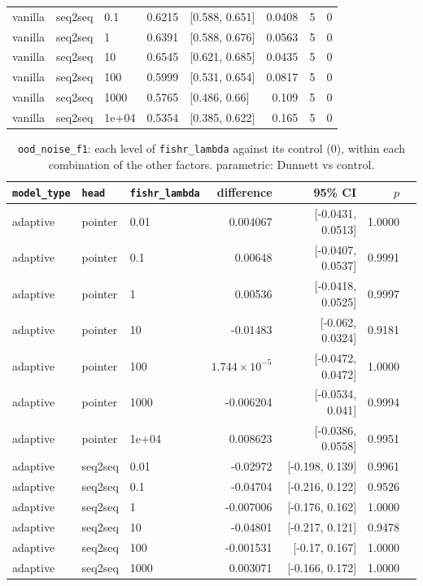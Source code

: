 \documentclass[10pt]{article}
\begin{document}
{\begin{longtable}{lllrlrrr}
vanilla & seq2seq & 0.1 & 0.6215 & [0.588, 0.651] & 0.0408 & 5 & 0\\
vanilla & seq2seq & 1 & 0.6391 & [0.588, 0.676] & 0.0563 & 5 & 0\\
vanilla & seq2seq & 10 & 0.6545 & [0.621, 0.685] & 0.0435 & 5 & 0\\
vanilla & seq2seq & 100 & 0.5999 & [0.531, 0.654] & 0.0817 & 5 & 0\\
vanilla & seq2seq & 1000 & 0.5765 & [0.486, 0.66] & 0.109 & 5 & 0\\
vanilla & seq2seq & 1e+04 & 0.5354 & [0.385, 0.622] & 0.165 & 5 & 0\\
\bottomrule
\end{longtable}
}

{\small
\begin{longtable}{lllrrrl}
\caption{\texttt{ood\_noise\_f1}: each level of \texttt{fishr\_lambda} against its control (0), within each combination of the other factors. parametric: Dunnett vs control.}\label{tab:control-ood_noise_f1}\\
\toprule
\texttt{model\_type} & \texttt{head} & \texttt{fishr\_lambda} & difference & 95\% CI & $p$ & \\
\midrule
\endhead
adaptive & pointer & 0.01 & 0.004067 & [-0.0431, 0.0513] & 1.0000 & \\
adaptive & pointer & 0.1 & 0.00648 & [-0.0407, 0.0537] & 0.9991 & \\
adaptive & pointer & 1 & 0.00536 & [-0.0418, 0.0525] & 0.9997 & \\
adaptive & pointer & 10 & -0.01483 & [-0.062, 0.0324] & 0.9181 & \\
adaptive & pointer & 100 & $1.744\times10^{-5}$ & [-0.0472, 0.0472] & 1.0000 & \\
adaptive & pointer & 1000 & -0.006204 & [-0.0534, 0.041] & 0.9994 & \\
adaptive & pointer & 1e+04 & 0.008623 & [-0.0386, 0.0558] & 0.9951 & \\
adaptive & seq2seq & 0.01 & -0.02972 & [-0.198, 0.139] & 0.9961 & \\
adaptive & seq2seq & 0.1 & -0.04704 & [-0.216, 0.122] & 0.9526 & \\
adaptive & seq2seq & 1 & -0.007006 & [-0.176, 0.162] & 1.0000 & \\
adaptive & seq2seq & 10 & -0.04801 & [-0.217, 0.121] & 0.9478 & \\
adaptive & seq2seq & 100 & -0.001531 & [-0.17, 0.167] & 1.0000 & \\
adaptive & seq2seq & 1000 & 0.003071 & [-0.166, 0.172] & 1.0000 & \\

\end{longtable}}
\end{document}
